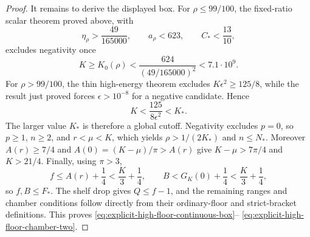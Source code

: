 \documentclass[11pt]{article}
\theoremstyle{remark}
\begin{document}
\begin{proof}
It remains to derive the displayed box.  For $\rho\leq99/100$, the
fixed-ratio scalar theorem proved above, with
\[
 \eta_\rho>\frac{49}{165000},\qquad a_\rho<623,\qquad
 C_*<\frac{13}{10},
\]
excludes negativity once
\[
 K\geq K_0(\rho)<
 \frac{624}{(49/165000)^2}<7.1\mathbin{\cdot}10^9.
\]
For $\rho>99/100$, the thin high-energy theorem excludes
$K\epsilon^2\geq125/8$, while the result just proved forces
$\epsilon>10^{-8}$ for a negative candidate.  Hence
\[
 K<\frac{125}{8\epsilon^2}<K_*.
\]
The larger value $K_*$ is therefore a global cutoff.  Negativity excludes
$p=0$, so $p\geq1$, $n\geq2$, and $r<\mu<K$, which yields
$\rho>1/(2K_*)$ and $n\leq N_*$.  Moreover
$A(r)\geq7/4$ and $A(0)=(K-\mu)/\pi>A(r)$ give
$K-\mu>7\pi/4$ and $K>21/4$.  Finally, using $\pi>3$,
\[
 f\leq A(r)+\frac14<\frac K3+\frac14,\qquad
 B<G_K(0)+\frac14<\frac K3+\frac14,
\]
so $f,B\leq F_*$.  The shelf drop gives $Q\leq f-1$, and the remaining
ranges and chamber conditions follow directly from their ordinary-floor
and strict-bracket definitions.  This proves
\eqref{eq:explicit-high-floor-continuous-box}--
\eqref{eq:explicit-high-floor-chamber-two}.
\end{proof}
\end{document}
